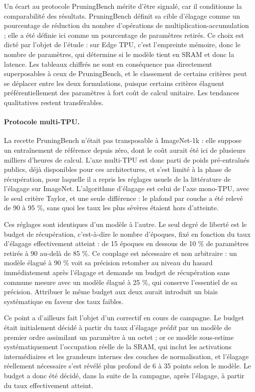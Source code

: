 \documentclass[11pt,a4paper]{report}
\begin{document}
Un écart au protocole PruningBench mérite d'être signalé, car il conditionne la comparabilité des résultats. PruningBench définit sa cible d'élagage comme un pourcentage de réduction du nombre d'opérations de multiplication-accumulation ; elle a été définie ici comme un pourcentage de paramètres retirés. Ce choix est dicté par l'objet de l'étude : sur Edge TPU, c'est l'empreinte mémoire, donc le nombre de paramètres, qui détermine si le modèle tient en SRAM et donc la latence. Les tableaux chiffrés ne sont en conséquence pas directement superposables à ceux de PruningBench, et le classement de certains critères peut se déplacer entre les deux formulations, puisque certains critères élaguent préférentiellement des paramètres à fort coût de calcul unitaire. Les tendances qualitatives restent transférables.

\paragraph{Protocole multi-TPU.} La recette PruningBench n'était pas transposable à ImageNet-1k : elle suppose un entraînement de référence depuis zéro, dont le coût aurait été ici de plusieurs milliers d'heures de calcul. L'axe multi-TPU est donc parti de poids pré-entraînés publics, déjà disponibles pour ces architectures, et s'est limité à la phase de récupération, pour laquelle il a repris les réglages usuels de la littérature de l'élagage sur ImageNet. L'algorithme d'élagage est celui de l'axe mono-TPU, avec le seul critère Taylor, et une seule différence : le plafond par couche a été relevé de 90 à 95 \%, sans quoi les taux les plus sévères étaient hors d'atteinte.

Ces réglages sont identiques d'un modèle à l'autre. Le seul degré de liberté est le budget de récupération, c'est-à-dire le nombre d'époques, fixé en fonction du taux d'élagage effectivement atteint : de 15 époques en dessous de 10 \% de paramètres retirés à 90 au-delà de 85 \%. Ce couplage est nécessaire et non arbitraire : un modèle élagué à 90 \% voit sa précision retomber au niveau du hasard immédiatement après l'élagage et demande un budget de récupération sans commune mesure avec un modèle élagué à 25 \%, qui conserve l'essentiel de sa précision. Attribuer le même budget aux deux aurait introduit un biais systématique en faveur des taux faibles.

Ce point a d'ailleurs fait l'objet d'un correctif en cours de campagne. Le budget était initialement décidé à partir du taux d'élagage \emph{prédit} par un modèle de premier ordre assimilant un paramètre à un octet ; or ce modèle sous-estime systématiquement l'occupation réelle de la SRAM, qui inclut les activations intermédiaires et les grandeurs internes des couches de normalisation, et l'élagage réellement nécessaire s'est révélé plus profond de 6 à 35 points selon le modèle. Le budget a donc été décidé, dans la suite de la campagne, après l'élagage, à partir du taux effectivement atteint.
\end{document}
